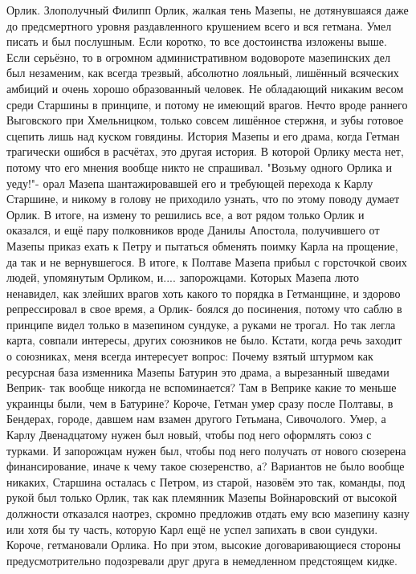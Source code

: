Орлик.
Злополучный Филипп Орлик, жалкая тень Мазепы, не дотянувшаяся даже до предсмертного уровня раздавленного крушением всего и вся гетмана.
Умел писать и был послушным.
Если коротко, то все достоинства изложены выше.
Если серьёзно, то в огромном административном водовороте мазепинских дел был незаменим, как всегда трезвый, абсолютно лояльный, лишённый всяческих амбиций и очень хорошо образованный человек.
Не обладающий никаким весом  среди Старшины в принципе, и потому не имеющий врагов.
Нечто вроде раннего Выговского при Хмельницком, только совсем лишённое стержня, и зубы готовое сцепить лишь над куском говядины.
История Мазепы и его драма, когда Гетман трагически ошибся в расчётах, это другая история.
В которой Орлику места нет, потому что его мнения вообще никто не спрашивал.
"Возьму одного Орлика и уеду!"- орал Мазепа шантажировавшей его и требующей перехода к Карлу Старшине, и никому в голову не приходило узнать, что по этому поводу думает Орлик.
В итоге, на измену то решились все, а вот рядом только Орлик и оказался, и ещё пару полковников вроде Данилы Апостола, получившего от Мазепы приказ ехать к Петру и пытаться обменять поимку Карла на прощение, да так и не вернувшегося.
В итоге, к Полтаве Мазепа прибыл с горсточкой своих людей, упомянутым Орликом, и.... запорожцами.
Которых Мазепа люто ненавидел, как злейших врагов хоть какого то порядка в Гетманщине, и здорово репрессировал в свое время, а Орлик- боялся до посинения, потому что саблю в принципе видел только в мазепином сундуке, а руками не трогал.
Но так легла карта, совпали интересы, других союзников не было.
Кстати, когда речь заходит о союзниках, меня всегда интересует вопрос:
Почему взятый штурмом как ресурсная база изменника Мазепы Батурин это драма, а вырезанный шведами Веприк- так вообще никогда не вспоминается?
Там в Веприке какие то меньше украинцы были, чем в Батурине?
Короче, Гетман умер сразу после Полтавы, в Бендерах, городе, давшем нам взамен другого Гетьмана, Сивочолого.
Умер, а Карлу Двенадцатому нужен был новый, чтобы под него оформлять союз с турками.
И запорожцам нужен был, чтобы под него получать от нового сюзерена финансирование, иначе к чему такое сюзеренство, а?
Вариантов не было вообще никаких, Старшина осталась с Петром, из старой, назовём это так, команды, под рукой был только Орлик, так как племянник Мазепы Войнаровский от высокой должности отказался наотрез, скромно предложив отдать ему всю мазепину казну или хотя бы ту часть, которую Карл ещё не успел запихать в свои сундуки.
Короче, гетмановали Орлика.
Но при этом, высокие договаривающиеся стороны предусмотрительно подозревали друг друга в немедленном предстоящем кидке.
